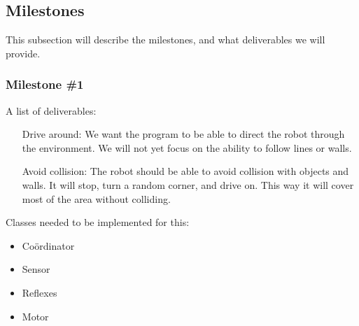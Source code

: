 \subsection{Milestones}
This subsection will describe the milestones, and what deliverables we will provide. 

\subsubsection{Milestone \#1}
A list of deliverables:
\begin{itemize}
\item[Drive around:] We want the program to be able to direct
the robot through the environment. We will not yet focus on the ability to
follow lines or walls.
\item[Avoid collision:] The robot should be able to avoid collision with objects
and walls. It will stop, turn a random corner, and drive on. This way it will
cover most of the area without colliding.
\end{itemize}

Classes needed to be implemented for this:
\begin{itemize}
\item Co\"ordinator
\item Sensor
\item Reflexes
\item Motor
\end{itemize}
